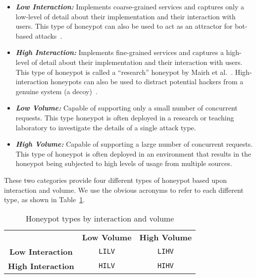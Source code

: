 \documentclass{ieeeaccess}
\begin{document}
\begin{itemize}

  \item \noindent \emph{\textbf{Low Interaction:}} Implements coarse-grained
    services and captures only a low-level of detail about their implementation
    and their interaction with users.  This type of honeypot can also be used
    to act as an attractor for bot-based attacks~\cite{SZB:16}.  

  \item \noindent \emph{\textbf{High Interaction:}} Implements fine-grained
    services and captures a high-level of detail about their implementation and
    their interaction with users.  This type of honeypot is called a
    ``research'' honeypot by Mairh et al.~\cite{MBVJ:11}. High-interaction
    honeypots can also be used to distract potential hackers from a genuine
    system (a decoy)~\cite{M:06,SNKA:12}.

\end{itemize}


\begin{itemize}

  \item \noindent \emph{\textbf{Low Volume:}} Capable of supporting only a
    small number of concurrent requests.  This type honeypot is often deployed
    in a research or teaching laboratory to investigate the details of a single
    attack type.

  \item \noindent \emph{\textbf{High Volume:}} Capable of supporting a large
    number of concurrent requests. This type of honeypot is often deployed in
    an environment that results in the honeypot being subjected to high levels
    of usage from multiple sources. 

\end{itemize}

These two categories provide four different types of honeypot based upon
interaction and volume. We use the obvious acronyms to refer to each different
type, as shown in Table~\ref{table:HoneypotTypes}.

\begin{table}[ht]
\caption{Honeypot types by interaction and volume\label{table:HoneypotTypes}}
\begin{center}
\setlength\doublerulesep{0.5pt}
\begin{tabular}{| c || c| c |}
\hline
 & \textbf{Low Volume} & \textbf{High Volume} \\
\hhline{|=||=|=|}
\textbf{Low Interaction} & \texttt{LILV} & \texttt{LIHV} \\
\hline
\textbf{High Interaction} & \texttt{HILV} & \texttt{HIHV} \\
\hline
\end{tabular}
\end{center}
\end{table}
\end{document}
